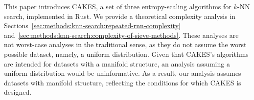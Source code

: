 This paper introduces CAKES, a set of three entropy-scaling algorithms for $k$-NN search, implemented in Rust.
We provide a theoretical complexity analysis in Sections~\ref{sec:methods:knn-search:repeated-rnn-complexity} and~\ref{sec:methods:knn-search:complexity-of-sieve-methods}.
These analyses are not worst-case analyses in the traditional sense, as they do not assume the worst possible dataset, namely, a uniform distribution.
Given that CAKES's algorithms are intended for datasets with a manifold structure, an analysis assuming a uniform distribution would be uninformative.
As a result, our analysis assumes datasets with manifold structure, reflecting the conditions for which CAKES is designed.
